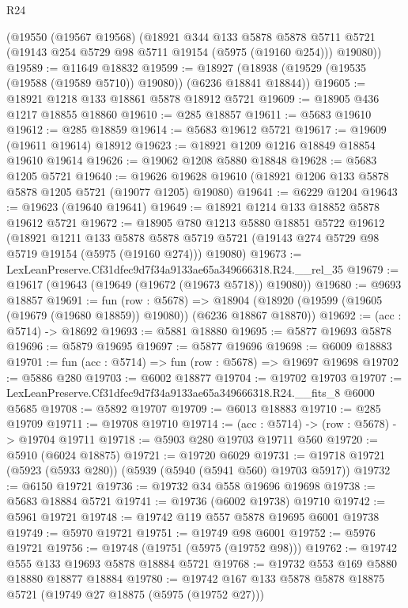 \begin{lexlean}{R24}
\begin{coremodule}
    (@19550
      (@19567 @19568)
      (@18921
        @344
        @133
        @5878
        @5878
        @5711
        @5721
        (@19143 @254 @5729 @98 @5711 @19154 (@5975 (@19160 @254)))
        @19080))
@19589 := @11649 @18832
@19599 := @18927 (@18938 (@19529 (@19535 (@19588 (@19589 @5710)) @19080)) (@6236 @18841 @18844))
@19605 := @18921 @1218 @133 @18861 @5878 @18912 @5721
@19609 := @18905 @436 @1217 @18855 @18860
@19610 := @285 @18857
@19611 := @5683 @19610
@19612 := @285 @18859
@19614 := @5683 @19612 @5721
@19617 := @19609 (@19611 @19614) @18912
@19623 := @18921 @1209 @1216 @18849 @18854 @19610 @19614
@19626 := @19062 @1208 @5880 @18848
@19628 := @5683 @1205 @5721
@19640 := @19626 @19628 @19610 (@18921 @1206 @133 @5878 @5878 @1205 @5721 (@19077 @1205) @19080)
@19641 := @6229 @1204
@19643 := @19623 (@19640 @19641)
@19649 := @18921 @1214 @133 @18852 @5878 @19612 @5721
@19672 := @18905
    @780
    @1213
    @5880
    @18851
    @5722
    @19612
    (@18921
      @1211
      @133
      @5878
      @5878
      @5719
      @5721
      (@19143 @274 @5729 @98 @5719 @19154 (@5975 (@19160 @274)))
      @19080)
@19673 := LexLeanPreserve.Cf31dfec9d7f34a9133ae65a349666318.R24.__rel_35
@19679 := @19617 (@19643 (@19649 (@19672 (@19673 @5718)) @19080))
@19680 := @9693 @18857
@19691 := fun (row : @5678) =>
  @18904 (@18920 (@19599 (@19605 (@19679 (@19680 @18859)) @19080)) (@6236 @18867 @18870))
@19692 := (acc : @5714) -> @18692
@19693 := @5881 @18880
@19695 := @5877 @19693 @5878
@19696 := @5879 @19695
@19697 := @5877 @19696
@19698 := @6009 @18883
@19701 := fun (acc : @5714) => fun (row : @5678) => @19697 @19698
@19702 := @5886 @280
@19703 := @6002 @18877
@19704 := @19702 @19703
@19707 := LexLeanPreserve.Cf31dfec9d7f34a9133ae65a349666318.R24.__fits_8 @6000 @5685
@19708 := @5892 @19707
@19709 := @6013 @18883
@19710 := @285 @19709
@19711 := @19708 @19710
@19714 := (acc : @5714) -> (row : @5678) -> @19704 @19711
@19718 := @5903 @280 @19703 @19711 @560
@19720 := @5910 (@6024 @18875)
@19721 := @19720 @6029
@19731 := @19718 @19721 (@5923 (@5933 @280)) (@5939 (@5940 (@5941 @560) @19703 @5917))
@19732 := @6150 @19721
@19736 := @19732 @34 @558 @19696 @19698
@19738 := @5683 @18884 @5721
@19741 := @19736 (@6002 @19738) @19710
@19742 := @5961 @19721
@19748 := @19742 @119 @557 @5878 @19695 @6001 @19738
@19749 := @5970 @19721
@19751 := @19749 @98 @6001
@19752 := @5976 @19721
@19756 := @19748 (@19751 (@5975 (@19752 @98)))
@19762 := @19742 @555 @133 @19693 @5878 @18884 @5721
@19768 := @19732 @553 @169 @5880 @18880 @18877 @18884
@19780 := @19742 @167 @133 @5878 @5878 @18875 @5721 (@19749 @27 @18875 (@5975 (@19752 @27)))

\end{coremodule}
\end{lexlean}
